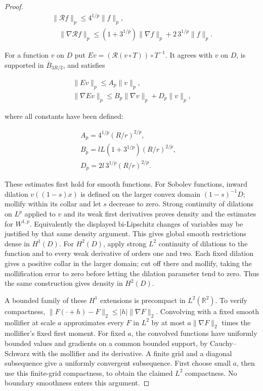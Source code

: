 \documentclass[11pt]{article}
\theoremstyle{definition}
\theoremstyle{remark}
\numberwithin{equation}{section}
\begin{document}
\begin{proof}
\begin{equation}\label{eq:src-2-04}
\begin{gathered}
\|\mathcal R f\|_p\le4^{1/p}\|f\|_p, \\
\quad\|\nabla\mathcal R f\|_p\le(1+3^{1/p})\|\nabla f\|_p+2\,3^{1/p}\|f\|_p.
\end{gathered}
\end{equation}

For a function $v$ on $D$ put $Ev=(\mathcal R(v\circ T))\circ T^{-1}$. It agrees with $v$ on $D$, is supported in $\overline B_{3R/2}$, and satisfies

\begin{equation}\label{eq:src-2-05}
\begin{gathered}
\|Ev\|_p\le A_p\|v\|_p,\qquad \\
\|\nabla Ev\|_p\le B_p\|\nabla v\|_p+D_p\|v\|_p,
\end{gathered}
\end{equation}

where all constants have been defined:

\begin{equation}\label{eq:src-2-06}
\begin{gathered}
A_p=4^{1/p}(R/r)^{2/p},\quad \\
B_p=lL(1+3^{1/p})(R/r)^{2/p},\quad \\
D_p=2l\,3^{1/p}(R/r)^{2/p}.
\end{gathered}
\end{equation}

These estimates first hold for smooth functions. For Sobolev functions, inward dilation $v((1-s)x)$ is defined on the larger convex domain $(1-s)^{-1}D$; mollify within its collar and let $s$ decrease to zero. Strong continuity of dilations on $L^p$ applied to $v$ and its weak first derivatives proves density and the estimates for $W^{1,p}$. Equivalently the displayed bi-Lipschitz changes of variables may be justified by that same density argument. This gives global smooth restrictions dense in $H^1(D)$. For $H^2(D)$, apply strong $L^2$ continuity of dilations to the function and to every weak derivative of orders one and two. Each fixed dilation gives a positive collar in the larger domain; cut off there and mollify, taking the mollification error to zero before letting the dilation parameter tend to zero. Thus the same construction gives density in $H^2(D)$.

A bounded family of these $H^1$ extensions is precompact in $L^2(\mathbb R^2)$. To verify compactness, $\|F(\cdot+h)-F\|_2\le|h|\|\nabla F\|_2$. Convolving with a fixed smooth mollifier at scale $a$ approximates every $F$ in $L^2$ by at most $a\|\nabla F\|_2$ times the mollifier's fixed first moment. For fixed $a$, the convolved functions have uniformly bounded values and gradients on a common bounded support, by Cauchy--Schwarz with the mollifier and its derivative. A finite grid and a diagonal subsequence give a uniformly convergent subsequence. First choose small $a$, then use this finite-grid compactness, to obtain the claimed $L^2$ compactness. No boundary smoothness enters this argument.


\end{proof}
\end{document}
